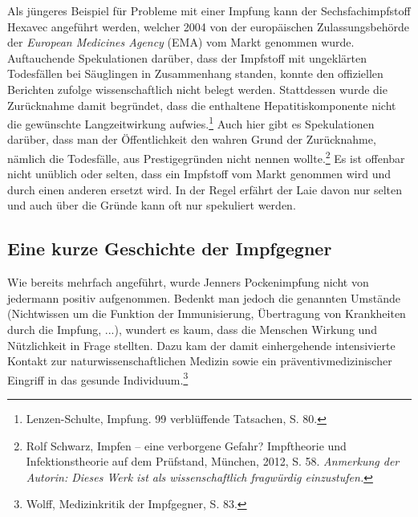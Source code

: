\documentclass[
    a4paper,
    12pt,
    hyphens,
    chapterprefix=true,
    headheight=33pt,
    footheight=29pt,
    headings=optiontohead, %
]{scrartcl}
\begin{document}
Als jüngeres Beispiel für Probleme mit einer Impfung kann der Sechsfachimpfstoff Hexavec angeführt werden, welcher 2004 von der europäischen Zulassungsbehörde der \textit{European Medicines Agency} (EMA) vom Markt genommen wurde. Auftauchende Spekulationen darüber, dass der Impfstoff mit ungeklärten Todesfällen bei Säuglingen in Zusammenhang standen, konnte den offiziellen Berichten zufolge wissenschaftlich nicht belegt werden. Stattdessen wurde die Zurücknahme damit begründet, dass die enthaltene Hepatitiskomponente nicht die gewünschte Langzeitwirkung aufwies.\footnote{Lenzen-Schulte, Impfung. 99 verblüffende Tatsachen, S. 80.} Auch hier gibt es Spekulationen darüber, dass man der Öffentlichkeit den wahren Grund der Zurücknahme, nämlich die Todesfälle, aus Prestigegründen nicht nennen wollte.\footnote{Rolf Schwarz, Impfen -- eine verborgene Gefahr? Impftheorie und Infektionstheorie auf dem Prüfstand, München, 2012, S. 58. \textit{Anmerkung der Autorin: Dieses Werk ist als wissenschaftlich fragwürdig einzustufen.}} Es ist offenbar nicht unüblich oder selten, dass ein Impfstoff vom Markt genommen wird und durch einen anderen ersetzt wird. In der Regel erfährt der Laie davon nur selten und auch über die Gründe kann oft nur spekuliert werden.

\subsection{Eine kurze Geschichte der Impfgegner}
Wie bereits mehrfach angeführt, wurde Jenners Pockenimpfung nicht von jedermann positiv aufgenommen. Bedenkt man jedoch die genannten Umstände (Nichtwissen um die Funktion der Immunisierung, Übertragung von Krankheiten durch die Impfung, ...), wundert es kaum, dass die Menschen Wirkung und Nützlichkeit in Frage stellten. Dazu kam der damit einhergehende intensivierte Kontakt zur naturwissenschaftlichen Medizin sowie ein präventivmedizinischer Eingriff in das gesunde Individuum.\footnote{Wolff, Medizinkritik der Impfgegner, S. 83.}\\
\end{document}
